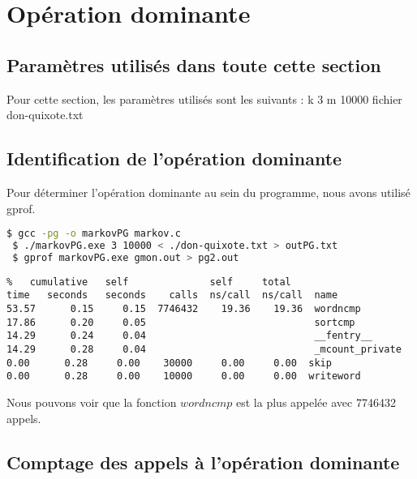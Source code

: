 
\section{Opération dominante}

\subsection{Paramètres utilisés dans toute cette section}

Pour cette section, les paramètres utilisés sont les suivants :
k 3
m 10000
fichier don-quixote.txt

\subsection{Identification de l'opération dominante}

Pour déterminer l'opération dominante au sein du programme, nous avons utilisé gprof.


\begin{lstlisting}[language=bash]
 $ gcc -pg -o markovPG markov.c
 $ ./markovPG.exe 3 10000 < ./don-quixote.txt > outPG.txt
 $ gprof markovPG.exe gmon.out > pg2.out
\end{lstlisting}

\begin{verbatim}
%   cumulative   self              self     total           
time   seconds   seconds    calls  ns/call  ns/call  name    
53.57      0.15     0.15  7746432    19.36    19.36  wordncmp
17.86      0.20     0.05                             sortcmp
14.29      0.24     0.04                             __fentry__
14.29      0.28     0.04                             _mcount_private
0.00      0.28     0.00    30000     0.00     0.00  skip
0.00      0.28     0.00    10000     0.00     0.00  writeword
\end{verbatim}
Nous pouvons voir que la fonction $wordncmp$ est la plus appelée avec 7746432 appels.





\subsection{Comptage des appels à l'opération dominante}

